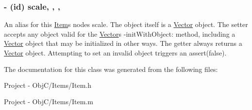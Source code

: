 \subsubsection[{scale}]{\setlength{\rightskip}{0pt plus 5cm}-\/ (id) scale\hspace{0.3cm}{\ttfamily [read]}, {\ttfamily [write]}, {\ttfamily [nonatomic]}, {\ttfamily [strong]}}\label{interface_item_a97f005fe980112511b6d5da41bd53beb}
An alias for this \hyperlink{interface_item}{Item}\textquotesingle{}s node\textquotesingle{}s scale. The object itself is a \hyperlink{interface_vector}{Vector} object. The setter accepts any object valid for the \hyperlink{interface_vector}{Vector}\textquotesingle{}s {\ttfamily -\/init\+With\+Object}\+: method, including a \hyperlink{interface_vector}{Vector} object that may be initialized in other ways. The getter always returns a \hyperlink{interface_vector}{Vector} object. Attempting to set an invalid object triggers an {\ttfamily assert(false)}. 

The documentation for this class was generated from the following files\+:\begin{DoxyCompactItemize}
\item 
Project -\/ Obj\+C/\+Items/Item.\+h\item 
Project -\/ Obj\+C/\+Items/Item.\+m\end{DoxyCompactItemize}
